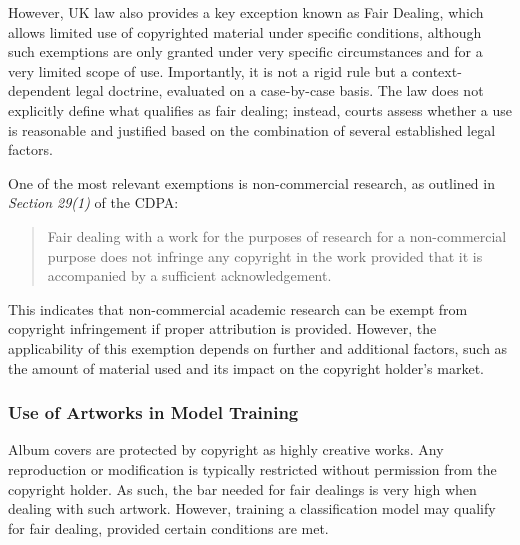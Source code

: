                   However, UK law also provides a key exception known as Fair Dealing, which allows limited use of copyrighted material under specific conditions, although such exemptions are only granted under very specific circumstances and for a very limited scope of use. Importantly, it is not a rigid rule but a context-dependent legal doctrine, evaluated on a case-by-case basis. The law does not explicitly define what qualifies as fair dealing; instead, courts assess whether a use is reasonable and justified based on the combination of several established legal factors.
                  
                  One of the most relevant exemptions is non-commercial research, as outlined in \textit{Section 29(1)} of the CDPA:
                  \begin{quote}
                      Fair dealing with a work for the purposes of research for a non-commercial purpose does not infringe any copyright in the work provided that it is accompanied by a sufficient acknowledgement. \cite{cdpa1988}
                  \end{quote}
    
                  This indicates that non-commercial academic research can be exempt from copyright infringement if proper attribution is provided. However, the applicability of this exemption depends on further and additional factors, such as the amount of material used and its impact on the copyright holder’s market.
    
              \subsubsection{Use of Artworks in Model Training}
              
                  Album covers are protected by copyright as highly creative works. Any reproduction or modification is typically restricted without permission from the copyright holder. As such, the bar needed for fair dealings is very high when dealing with such artwork. However, training a classification model may qualify for fair dealing, provided certain conditions are met.
    
